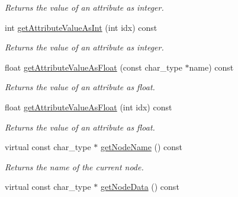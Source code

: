 \begin{DoxyCompactItemize}
\begin{DoxyCompactList}\small\item\em Returns the value of an attribute as integer. \end{DoxyCompactList}\item 
\hypertarget{classirr_1_1io_1_1_c_x_m_l_reader_impl_a8c8cf8e6560299e3315cd1a75477bd53}{int \hyperlink{classirr_1_1io_1_1_c_x_m_l_reader_impl_a8c8cf8e6560299e3315cd1a75477bd53}{get\+Attribute\+Value\+As\+Int} (int idx) const }\label{classirr_1_1io_1_1_c_x_m_l_reader_impl_a8c8cf8e6560299e3315cd1a75477bd53}

\begin{DoxyCompactList}\small\item\em Returns the value of an attribute as integer. \end{DoxyCompactList}\item 
\hypertarget{classirr_1_1io_1_1_c_x_m_l_reader_impl_a89fb9f69bba65c76e23d6519bcb5df7d}{float \hyperlink{classirr_1_1io_1_1_c_x_m_l_reader_impl_a89fb9f69bba65c76e23d6519bcb5df7d}{get\+Attribute\+Value\+As\+Float} (const char\+\_\+type $\ast$name) const }\label{classirr_1_1io_1_1_c_x_m_l_reader_impl_a89fb9f69bba65c76e23d6519bcb5df7d}

\begin{DoxyCompactList}\small\item\em Returns the value of an attribute as float. \end{DoxyCompactList}\item 
\hypertarget{classirr_1_1io_1_1_c_x_m_l_reader_impl_a14d3f55dd2260b970525336713b8270e}{float \hyperlink{classirr_1_1io_1_1_c_x_m_l_reader_impl_a14d3f55dd2260b970525336713b8270e}{get\+Attribute\+Value\+As\+Float} (int idx) const }\label{classirr_1_1io_1_1_c_x_m_l_reader_impl_a14d3f55dd2260b970525336713b8270e}

\begin{DoxyCompactList}\small\item\em Returns the value of an attribute as float. \end{DoxyCompactList}\item 
\hypertarget{classirr_1_1io_1_1_c_x_m_l_reader_impl_a30ddc03ee634ed0dbeef25547677f2da}{virtual const char\+\_\+type $\ast$ \hyperlink{classirr_1_1io_1_1_c_x_m_l_reader_impl_a30ddc03ee634ed0dbeef25547677f2da}{get\+Node\+Name} () const }\label{classirr_1_1io_1_1_c_x_m_l_reader_impl_a30ddc03ee634ed0dbeef25547677f2da}

\begin{DoxyCompactList}\small\item\em Returns the name of the current node. \end{DoxyCompactList}\item 
\hypertarget{classirr_1_1io_1_1_c_x_m_l_reader_impl_ac661ef32418a004c1ec3b6e02c9615df}{virtual const char\+\_\+type $\ast$ \hyperlink{classirr_1_1io_1_1_c_x_m_l_reader_impl_ac661ef32418a004c1ec3b6e02c9615df}{get\+Node\+Data} () const }\label{classirr_1_1io_1_1_c_x_m_l_reader_impl_ac661ef32418a004c1ec3b6e02c9615df}


\end{DoxyCompactItemize}
